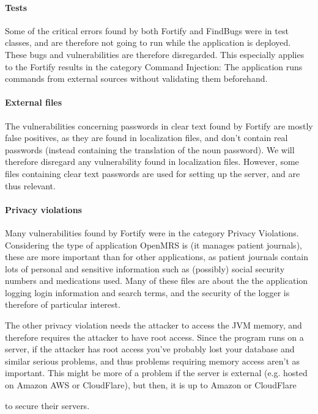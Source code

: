 \documentclass{report} %
\begin{document}
\paragraph{Tests}
Some of the critical errors found by both Fortify and FindBugs were in test
classes, and are therefore not going to run while the application is deployed.
These bugs and vulnerabilities are therefore disregarded. This especially
applies to the Fortify results in the category Command Injection: The
application runs commands from external sources without validating them
beforehand.

\paragraph{External files}
The vulnerabilities concerning passwords in clear text found by Fortify are
mostly false positives, as they are found in localization files, and don't
contain real passwords (instead containing the translation of the noun
password). We will therefore disregard any vulnerability found in localization
files. However, some files containing clear text passwords are used for setting
up the server, and are thus relevant.

\paragraph{Privacy violations}
Many vulnerabilities found by Fortify were in the category Privacy Violations.
Considering the type of application OpenMRS is (it manages patient journals),
these are more important than for other applications, as patient journals
contain lots of personal and sensitive information such as (possibly) social security
numbers and medications used. Many of these files are about the the application
logging login information and search terms, and the security of the logger is therefore of
particular interest.

The other privacy violation needs the attacker to access the JVM memory, and
therefore requires the attacker to have root access. Since the program runs on a
server, if the attacker has root access you've probably lost your database and
similar serious problems, and thus problems requiring memory access aren't as
important. This might be more of a problem if the server is external (e.g.
hosted on Amazon AWS or CloudFlare), but then, it is up to Amazon or CloudFlare

to secure their servers.
\end{document}
